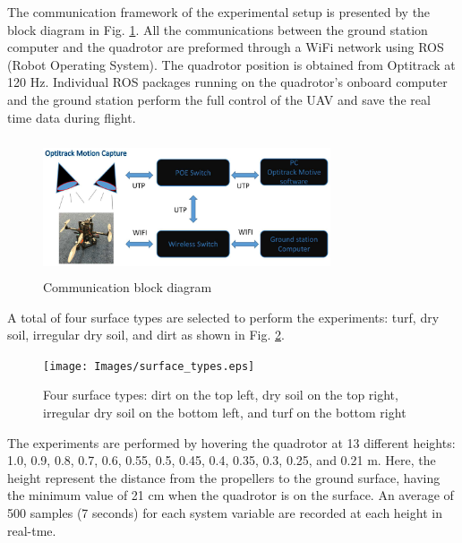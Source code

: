 \documentclass[twocolumn,10pt]{asme2ej}
\begin{document}
The communication framework of the experimental setup is presented by the block diagram in Fig. \ref{comm_block_diagram}. All the communications between the ground station computer and the quadrotor are preformed through a WiFi network using ROS (Robot Operating System). The quadrotor position is obtained from Optitrack \cite{Optitrack} at 120 Hz. Individual ROS packages running on the quadrotor's onboard computer and the ground station perform the full control of the UAV and save the real time data during flight.

\begin{figure}[t]
    \begin{center}
        \setlength{\unitlength}{0.012500in}%
        \includegraphics[width=8.5cm, height=4cm]{Images/block_diagram.eps}
    \end{center}
    \caption{Communication block diagram}
    \label{comm_block_diagram}
\end{figure}

A total of four surface types are selected to perform the experiments: turf, dry soil, irregular dry soil, and dirt as shown in Fig. \ref{surface_types}.

\begin{figure}[t]
    \begin{center}
        \setlength{\unitlength}{0.012500in}%
        \texttt{[image: Images/surface\_types.eps]}
    \end{center}
    \caption{Four surface types: dirt on the top left, dry soil on the top right, irregular dry soil on the bottom left, and turf on the bottom right}
    \label{surface_types}
\end{figure}

The experiments are performed by hovering the quadrotor at 13 different heights: 1.0, 0.9, 0.8, 0.7, 0.6, 0.55, 0.5, 0.45, 0.4, 0.35, 0.3, 0.25, and 0.21 m. Here, the height represent the distance from the propellers to the ground surface, having the minimum value of 21 cm when the quadrotor is on the surface. An average of 500 samples (7 seconds) for each system variable are recorded at each height in real-tme.
\end{document}
